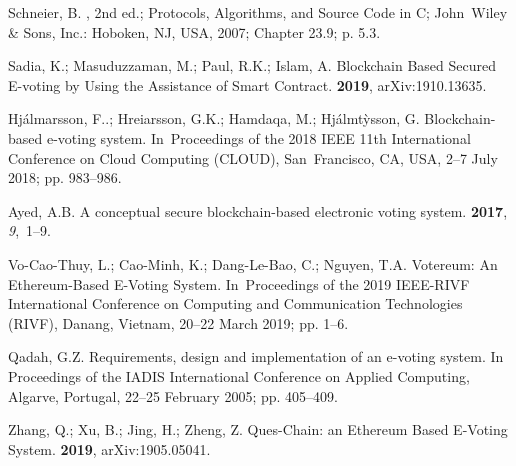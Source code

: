 \documentclass[applsci,article,accept,moreauthors,pdftex]{Definitions/mdpi}
\begin{document}
\begin{thebibliography}{999}
\providecommand{\natexlab}[1]{#1}

Schneier, B.
, 2nd ed.; Protocols, Algorithms, and
  Source Code in C; John~Wiley \& Sons, Inc.: Hoboken, NJ, USA,  2007; Chapter 23.9; p. 5.3.

Sadia, K.; Masuduzzaman, M.; Paul, R.K.; Islam, A.
\newblock Blockchain Based Secured E-voting by Using the Assistance of Smart
  Contract.
 {\bf 2019}, arXiv:1910.13635.

Hj{\'a}lmarsson, F.{\TH}.; Hrei{\dh}arsson, G.K.; Hamdaqa, M.;
  Hj{\'a}lmt{\`y}sson, G.
\newblock Blockchain-based e-voting system.
\newblock In~Proceedings of the  2018 IEEE 11th International Conference on Cloud Computing (CLOUD), {San~Francisco, CA, USA, 2--7 July 2018}; pp. 983--986.%

Ayed, A.B.
\newblock A conceptual secure blockchain-based electronic voting system.
  {\bf 2017}, {\em 9},~1--9.

Vo-Cao-Thuy, L.; Cao-Minh, K.; Dang-Le-Bao, C.; Nguyen, T.A.
\newblock Votereum: An Ethereum-Based E-Voting System.
\newblock  In~Proceedings of the 2019 IEEE-RIVF International Conference on Computing and
  Communication Technologies (RIVF), {Danang, Vietnam, 20--22 March 2019}; pp. 1--6.%

Qadah, G.Z.
\newblock Requirements, design and implementation of an e-voting system.
\newblock  In  Proceedings of the IADIS International Conference on Applied Computing, {Algarve, Portugal,  22--25 February 2005}; pp. 405--409.%


Zhang, Q.; Xu, B.; Jing, H.; Zheng, Z.
\newblock Ques-Chain: an Ethereum Based E-Voting System.
 {\bf 2019},  arXiv:1905.05041.


\end{thebibliography}
\end{document}

